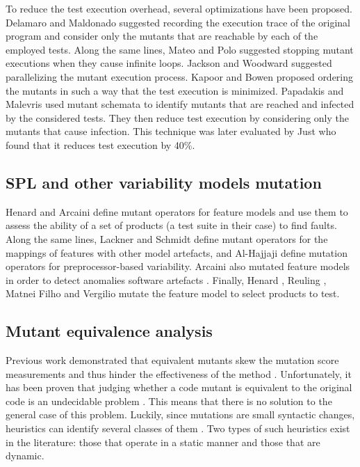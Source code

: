 To reduce the test execution overhead, several optimizations have been proposed. Delamaro and Maldonado \cite{Delamaro2001} suggested recording the execution trace of the original program and consider only the mutants that are reachable by each of the employed tests. Along the same lines, Mateo and Polo \cite{Mateo2014} suggested stopping mutant executions when they cause infinite loops. Jackson and Woodward \cite{Jackson2001} suggested parallelizing the mutant execution process. Kapoor and Bowen \cite{Kapoor2004} proposed ordering the mutants in such a way that the test execution is minimized. Papadakis and Malevris \cite{Papadakis2011} used mutant schemata to identify mutants that are reached and infected by the considered tests. They then reduce test execution by considering only the mutants that cause infection. This technique was later evaluated by Just \etal \cite{Just2014a} who found that it reduces test execution by 40\%. 

\subsection{\gls{SPL} and other variability models mutation}

Henard \etal \cite{Henard2013b,Henard2014} and Arcaini \etal \cite{Arcaini2015a,Arcaini2016a} define mutant operators for feature models and use them to assess the ability of a set of products (\ie a test suite in their case) to find faults. Along the same lines, Lackner and Schmidt \cite{Lackner2014} define mutant operators for the mappings of features with other model artefacts, and Al-Hajjaji \etal \cite{Al-Hajjaji2016b} define mutation operators for preprocessor-based variability. Arcaini \etal \cite{Arcaini2017} also mutated feature models in order to detect anomalies software artefacts \cite{Arcaini2017}. Finally, Henard \etal \cite{Henard2014}, Reuling \etal \cite{Reuling2015a}, Matnei Filho and Vergilio \cite{MatneiFilho2016} mutate the feature model to select products to test. 

\subsection{Mutant equivalence analysis}

Previous work demonstrated that equivalent mutants skew the mutation score measurements and thus hinder the effectiveness of the method \cite{Madeyski2014}. Unfortunately, it has been proven that judging whether a code mutant is equivalent to the original code is an undecidable problem \cite{Budd1982}. This means that there is no solution to the general case of this problem. Luckily, since mutations are small syntactic changes, heuristics can identify several classes of them \cite{Papadakis2015}. Two types of such heuristics exist in the literature: those that operate in a static manner and those that are dynamic. 

